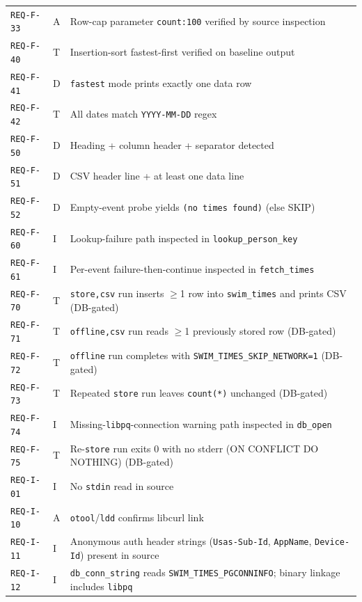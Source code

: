 \documentclass[12pt]{article}
\newcommand{\code}[1]{\texttt{#1}}
\newcommand{\req}[1]{\texttt{#1}}
\begin{document}
\begin{center}
\begin{longtable}{p{2.6cm}p{1.0cm}p{8.4cm}}
  \req{REQ-F-33}    & A & Row-cap parameter \code{count:100} verified by source inspection \\
  \req{REQ-F-40}    & T & Insertion-sort fastest-first verified on baseline output   \\
  \req{REQ-F-41}    & D & \code{fastest} mode prints exactly one data row            \\
  \req{REQ-F-42}    & T & All dates match \code{YYYY-MM-DD} regex                    \\
  \req{REQ-F-50}    & D & Heading + column header + separator detected               \\
  \req{REQ-F-51}    & D & CSV header line + at least one data line                   \\
  \req{REQ-F-52}    & D & Empty-event probe yields \code{(no times found)} (else SKIP) \\
  \req{REQ-F-60}    & I & Lookup-failure path inspected in \code{lookup\_person\_key} \\
  \req{REQ-F-61}    & I & Per-event failure-then-continue inspected in \code{fetch\_times} \\
  \req{REQ-F-70}    & T & \code{store,csv} run inserts $\geq$1 row into \texttt{swim\_times} and prints CSV (DB-gated) \\
  \req{REQ-F-71}    & T & \code{offline,csv} run reads $\geq$1 previously stored row (DB-gated) \\
  \req{REQ-F-72}    & T & \code{offline} run completes with \texttt{SWIM\_TIMES\_SKIP\_NETWORK=1} (DB-gated) \\
  \req{REQ-F-73}    & T & Repeated \code{store} run leaves \texttt{count(*)} unchanged (DB-gated) \\
  \req{REQ-F-74}    & I & Missing-\texttt{libpq}-connection warning path inspected in \code{db\_open} \\
  \req{REQ-F-75}    & T & Re-\code{store} run exits 0 with no stderr (ON CONFLICT DO NOTHING) (DB-gated) \\
  \req{REQ-I-01}    & I & No \code{stdin} read in source                              \\
  \req{REQ-I-10}    & A & \code{otool}/\code{ldd} confirms libcurl link               \\
  \req{REQ-I-11}    & I & Anonymous auth header strings (\code{Usas-Sub-Id}, \code{AppName}, \code{Device-Id}) present in source \\
  \req{REQ-I-12}    & I & \code{db\_conn\_string} reads \texttt{SWIM\_TIMES\_PGCONNINFO}; binary linkage includes \texttt{libpq} \\

\end{longtable}
\end{center}
\end{document}
